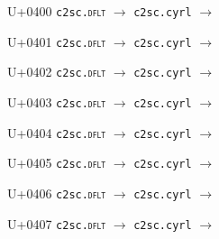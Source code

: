 \documentclass{article}
\begin{document}
\clearpage

\begin{substitutions}

U+0400  \linebreak
    \texttt{c2sc.\textsc{dflt}} $\to$  \linebreak
    \texttt{c2sc.cyrl} $\to$  

\goodbreak

U+0401  \linebreak
    \texttt{c2sc.\textsc{dflt}} $\to$  \linebreak
    \texttt{c2sc.cyrl} $\to$  

\goodbreak

U+0402  \linebreak
    \texttt{c2sc.\textsc{dflt}} $\to$  \linebreak
    \texttt{c2sc.cyrl} $\to$  

\goodbreak

U+0403  \linebreak
    \texttt{c2sc.\textsc{dflt}} $\to$  \linebreak
    \texttt{c2sc.cyrl} $\to$  

\goodbreak

U+0404  \linebreak
    \texttt{c2sc.\textsc{dflt}} $\to$  \linebreak
    \texttt{c2sc.cyrl} $\to$  

\goodbreak

U+0405  \linebreak
    \texttt{c2sc.\textsc{dflt}} $\to$  \linebreak
    \texttt{c2sc.cyrl} $\to$  

\goodbreak

U+0406  \linebreak
    \texttt{c2sc.\textsc{dflt}} $\to$  \linebreak
    \texttt{c2sc.cyrl} $\to$  

\goodbreak

U+0407  \linebreak
    \texttt{c2sc.\textsc{dflt}} $\to$  \linebreak
    \texttt{c2sc.cyrl} $\to$  


\end{substitutions}
\end{document}
